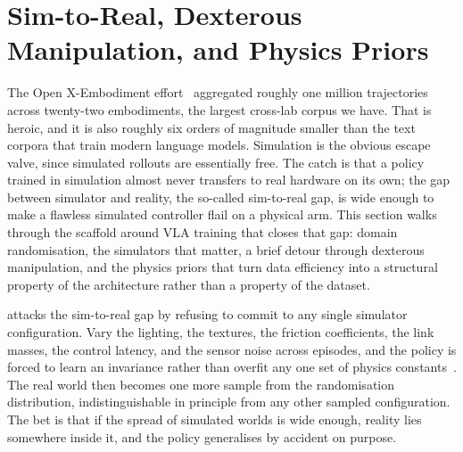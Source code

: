 
\section{Sim-to-Real, Dexterous Manipulation, and Physics Priors}


 The Open X-Embodiment effort~\cite{Padalkar2024OpenXEmbodiment} aggregated roughly one million trajectories across twenty-two embodiments, the largest cross-lab corpus we have. That is heroic, and it is also roughly six orders of magnitude smaller than the text corpora that train modern language models. Simulation is the obvious escape valve, since simulated rollouts are essentially free. The catch is that a policy trained in simulation almost never transfers to real hardware on its own; the gap between simulator and reality, the so-called sim-to-real gap, is wide enough to make a flawless simulated controller flail on a physical arm. This section walks through the scaffold around VLA training that closes that gap: domain randomisation, the simulators that matter, a brief detour through dexterous manipulation, and the physics priors that turn data efficiency into a structural property of the architecture rather than a property of the dataset.

\vspace{1.5em}

 attacks the sim-to-real gap by refusing to commit to any single simulator configuration. Vary the lighting, the textures, the friction coefficients, the link masses, the control latency, and the sensor noise across episodes, and the policy is forced to learn an invariance rather than overfit any one set of physics constants~\cite{Tobin2017DomainRandomization}. The real world then becomes one more sample from the randomisation distribution, indistinguishable in principle from any other sampled configuration. The bet is that if the spread of simulated worlds is wide enough, reality lies somewhere inside it, and the policy generalises by accident on purpose.

